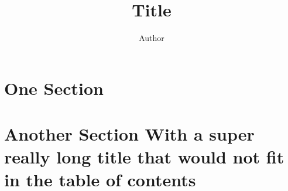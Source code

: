 \documentclass[10pt]{article}
\title{Title}
\author{Author}
\begin{document}
\maketitle

\tableofcontents

\section{One Section}
\section[short title 2]{Another Section With a super really long title that would not fit in the table of contents}
\end{document}

